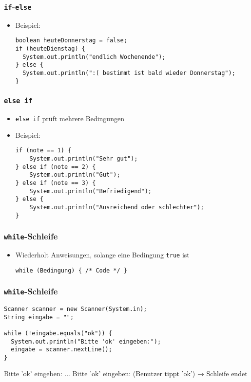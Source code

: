 \documentclass{../../presentation}
\begin{document}
\begin{frame}[fragile]
  \frametitle{\texttt{if}-\texttt{else}}
  \begin{itemize}
    \item<1-> Beispiel:
          \begin{verbatim}
boolean heuteDonnerstag = false;
if (heuteDienstag) {
  System.out.println("endlich Wochenende");
} else {
  System.out.println(":( bestimmt ist bald wieder Donnerstag");
}
\end{verbatim}
  \end{itemize}
\end{frame}

\begin{frame}[fragile]
  \frametitle{\texttt{else if}}
  \begin{itemize}
    \item \texttt{else if} prüft mehrere Bedingungen
    \item Beispiel:
          \begin{verbatim}
if (note == 1) {
    System.out.println("Sehr gut");
} else if (note == 2) {
    System.out.println("Gut");
} else if (note == 3) {
    System.out.println("Befriedigend");
} else {
    System.out.println("Ausreichend oder schlechter");
} 
    \end{verbatim}
  \end{itemize}
\end{frame}

\begin{frame}[fragile]
  \frametitle{\texttt{while}-Schleife}
  \begin{itemize}
    \item  Wiederholt Anweisungen, solange eine Bedingung \texttt{true} ist
          \begin{verbatim}
while (Bedingung) { /* Code */ }
        \end{verbatim}
  \end{itemize}
\end{frame}

\begin{frame}[fragile]
  \frametitle{\texttt{while}-Schleife}
  \begin{verbatim}
Scanner scanner = new Scanner(System.in);
String eingabe = "";

while (!eingabe.equals("ok")) {
  System.out.println("Bitte 'ok' eingeben:");
  eingabe = scanner.nextLine();
}
  \end{verbatim}
  \begin{ausgabe}
    Bitte 'ok' eingeben: \newline
    ...\newline
    Bitte 'ok' eingeben: \newline
    (Benutzer tippt 'ok') → Schleife endet
  \end{ausgabe}
\end{frame}
\end{document}
